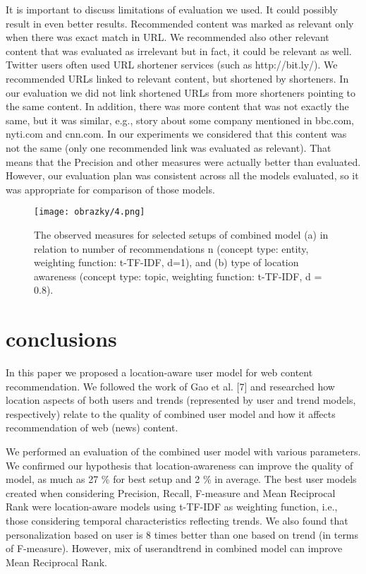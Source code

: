 \documentclass[a4, conference]{IEEEtran}
\begin{document}
  It  is  important  to  discuss  limitations  of  evaluation  we used.   It   could   possibly   result   in   even   better   results. Recommended content  was  marked  as  relevant  only  when there was exact match in URL. We recommended also other relevant content that was evaluated as irrelevant but in fact, it could  be  relevant  as  well.  Twitter  users  often  used  URL shortener  services  (such  as  http://bit.ly/).  We  recommended URLs    linked    to    relevant    content,    but    shortened    by shorteners. In our evaluation we did not link shortened URLs from   more   shorteners   pointing   to   the   same   content. In addition,  there  was  more  content  that  was  not  exactly  the same,  but  it  was  similar,  e.g.,  story  about  some  company mentioned   in   bbc.com,   nyti.com   and   cnn.com.   In   our experiments  we  considered  that  this  content  was  not  the same   (only   one   recommended   link   was  evaluated   as relevant).  That  means  that  the  Precision  and  other measures were actually better than evaluated. However, our evaluation plan was consistent across all the models evaluated, so it was appropriate for comparison of those models.


\begin{figure}[t]
\texttt{[image: obrazky/4.png]}
\caption{The observed measures for selected setups of combined model (a) in relation to number of recommendations n (concept type: entity, weighting function: t-TF-IDF, d=1), and (b) type of location awareness (concept type: topic, weighting function: t-TF-IDF, d = 0.8).}
\end{figure}

\section{conclusions}

In  this  paper  we  proposed  a  location-aware  user  model for  web  content  recommendation.  We  followed  the  work  of Gao  et  al.  [7]  and  researched  how  location  aspects of  both users  and  trends  (represented  by user  and  trend  models, respectively)  relate  to  the  quality  of  combined  user  model and how it affects recommendation of web (news) content. 

We performed an evaluation of the combined user model with  various  parameters.  We  confirmed  our  hypothesis  that location-awareness  can  improve  the  quality  of  model,  as much  as  27  \%  for  best  setup  and  2  \%  in  average.  The best user  models  created  when  considering  Precision,  Recall,  F-measure  and  Mean  Reciprocal  Rank  were  location-aware models  using  t-TF-IDF  as  weighting  function,  i.e., those considering  temporal  characteristics  reflecting  trends.  We also found that personalization based on user is 8 times better  than  one  based  on  trend  (in  terms  of  F-measure).  However, mix of userandtrend in combined model can improve Mean Reciprocal Rank. 
\end{document}
